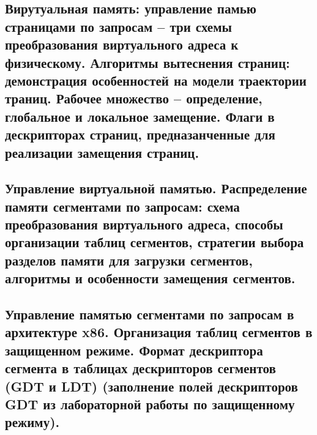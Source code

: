 \newpage

\subsection{Вирутуальная память: управление памью страницами по запросам – три схемы преобразования виртуального адреса к физическому. Алгоритмы вытеснения страниц: демонстрация особенностей на модели траектории траниц. Рабочее множество – определение, глобальное и локальное замещение. Флаги в дескрипторах страниц, предназанченные для реализации замещения страниц.}

\newpage

\subsection{Управление виртуальной памятью. Распределение памяти сегментами по запросам: схема преобразования виртуального адреса, способы организации таблиц сегментов, стратегии выбора разделов памяти для загрузки сегментов, алгоритмы и особенности замещения сегментов.}

\newpage

\subsection{Управление памятью сегментами по запросам в архитектуре x86. Организация таблиц сегментов в защищенном режиме. Формат дескриптора сегмента в таблицах дескрипторов сегментов (GDT и LDT) (заполнение полей дескрипторов GDT из лабораторной работы по защищенному режиму).}
